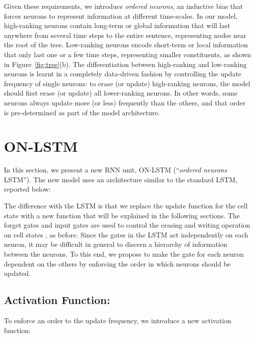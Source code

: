 \documentclass{article} \usepackage{iclr2019_conference,times}
\begin{document}
Given these requirements, we introduce \emph{ordered neurons}, an inductive bias that forces neurons to represent information at different time-scales. In our model, high-ranking neurons contain long-term or global information that will last anywhere from several time steps to the entire sentence, representing nodes near the root of the tree. Low-ranking neurons encode short-term or local information that only last one or a few time steps, representing smaller constituents, as shown in Figure~\ref{fig:tree}(b). The differentiation between high-ranking and low-ranking neurons is learnt in a completely data-driven fashion by controlling the update frequency of single neurons: to erase (or update) high-ranking neurons, the model should first erase (or update) all lower-ranking neurons. In other words, some neurons always update more (or less) frequently than the others, and that order is pre-determined as part of the model architecture.
























%
 
\section{ON-LSTM}
In this section, we present a new RNN unit, ON-LSTM (``\emph{ordered neurons} LSTM'').
The new model uses an architecture similar to the standard LSTM, reported below:

The difference with the LSTM is that we replace the update function for the cell state  with a new function that will be explained in the following sections.
The forget gates  and input gates  are used to control the erasing and writing operation on cell states , as before.
Since the gates in the LSTM act independently on each neuron, it may be difficult in general to discern a hierarchy of information between the neurons. To this end, we propose to make the gate for each neuron dependent on the others by enforcing the order in which neurons should be updated.


\subsection{Activation Function: }
To enforce an order to the update frequency, we introduce a new activation function:
\end{document}
